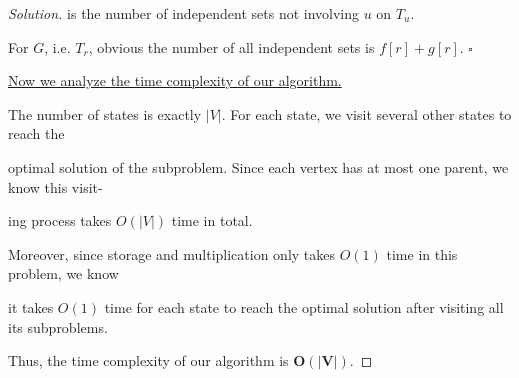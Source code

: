 \documentclass{article}
\newcommand{\whiteqed}{\hfill $\square$\par}
\newenvironment{solution}{\begin{proof}[\noindent\it Solution]}{\end{proof}}
\begin{document}
\begin{solution}
    \hspace{2.6em}
    is the number of independent sets not involving $u$ on $T_u$.
    
    \vspace{1em} \hspace{2.6em}
    For $G$, i.e. $T_r$, obvious the number of all independent sets is $f[r]+g[r]$. \whiteqed
    
    \vspace{3em} \hspace{2.6em}
    \underline{Now we analyze the time complexity of our algorithm.}
    
    \hspace{2.6em}
    The number of states is exactly $|V|.$ For each state, we visit several other states to reach the
    
    optimal solution of the subproblem. Since each vertex has at most one parent, we know this visit-
    
    ing process takes $O(|V|)$ time in total.
    
    \hspace{2.6em}
    Moreover, since storage and multiplication only takes $O(1)$ time in this problem, we know 
    
    it takes $O(1)$ time for each state to reach the optimal solution after visiting all its subproblems. 
    
    \hspace{2.6em}
    Thus, the time complexity of our algorithm is \underline{$\boldsymbol{O(|V|).}$}
\end{solution}

\vspace{1em}
\end{document}
